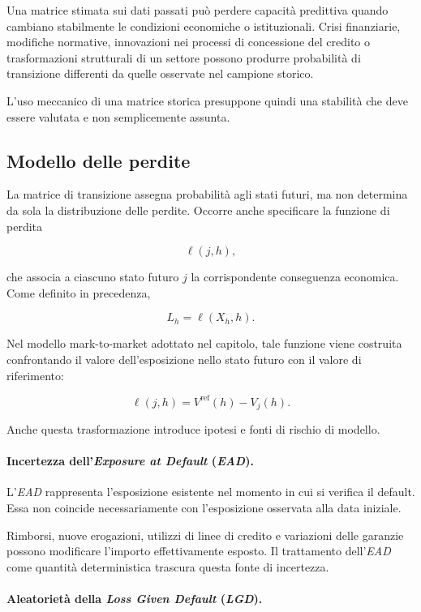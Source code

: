 Una matrice stimata sui dati passati pu\`{o} perdere capacit\`{a}
predittiva quando cambiano stabilmente le condizioni economiche o
istituzionali. Crisi finanziarie, modifiche normative, innovazioni nei
processi di concessione del credito o trasformazioni strutturali di un
settore possono produrre probabilit\`{a} di transizione differenti da
quelle osservate nel campione storico.

L'uso meccanico di una matrice storica presuppone quindi una stabilit\`{a}
che deve essere valutata e non semplicemente assunta.

\subsection{Modello delle perdite}

\label{subsec:cap9-limiti-perdite}

La matrice di transizione assegna probabilit\`{a} agli stati futuri,
ma non determina da sola la distribuzione delle perdite. Occorre anche
specificare la funzione di perdita

\[
\ell(j,h),
\]

che associa a ciascuno stato futuro $j$ la corrispondente conseguenza
economica. Come definito in precedenza,

\[
L_h=\ell(X_h,h).
\]

Nel modello mark-to-market adottato nel capitolo, tale funzione viene
costruita confrontando il valore dell'esposizione nello stato futuro
con il valore di riferimento:

\[
\ell(j,h)
=
V^{\mathrm{ref}}(h)-V_j(h).
\]

Anche questa trasformazione introduce ipotesi e fonti di rischio di
modello.

\paragraph{Incertezza dell'\emph{Exposure at Default} (\emph{EAD}).}

L'\emph{EAD} rappresenta l'esposizione esistente nel momento in cui si
verifica il default. Essa non coincide necessariamente con
l'esposizione osservata alla data iniziale.

Rimborsi, nuove erogazioni, utilizzi di linee di credito e variazioni
delle garanzie possono modificare l'importo effettivamente esposto. Il
trattamento dell'\emph{EAD} come quantit\`{a} deterministica trascura
questa fonte di incertezza.

\paragraph{Aleatoriet\`{a} della \emph{Loss Given Default} (\emph{LGD}).}

